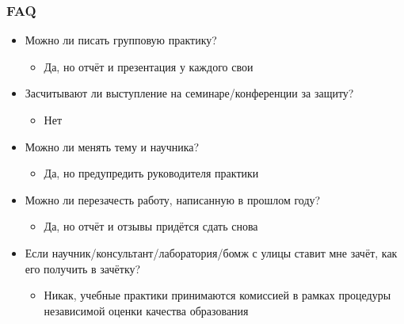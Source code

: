 \documentclass{../../slides-style}
\begin{document}
    \begin{frame}
        \frametitle{FAQ}
        \begin{itemize}
            \item Можно ли писать групповую практику?
            \begin{itemize}
                \item Да, но отчёт и презентация у каждого свои
            \end{itemize}
            \item Засчитывают ли выступление на семинаре/конференции за защиту?
            \begin{itemize}
                \item Нет
            \end{itemize}
            \item Можно ли менять тему и научника?
            \begin{itemize}
                \item Да, но предупредить руководителя практики
            \end{itemize}
            \item Можно ли перезачесть работу, написанную в прошлом году?
            \begin{itemize}
                \item Да, но отчёт и отзывы придётся сдать снова
            \end{itemize}
            \item Если научник/консультант/лаборатория/бомж с улицы ставит мне зачёт, как его получить в зачётку?
            \begin{itemize}
                \item Никак, учебные практики принимаются комиссией в рамках процедуры независимой оценки качества образования
            \end{itemize}
        \end{itemize}
    \end{frame}
\end{document}
